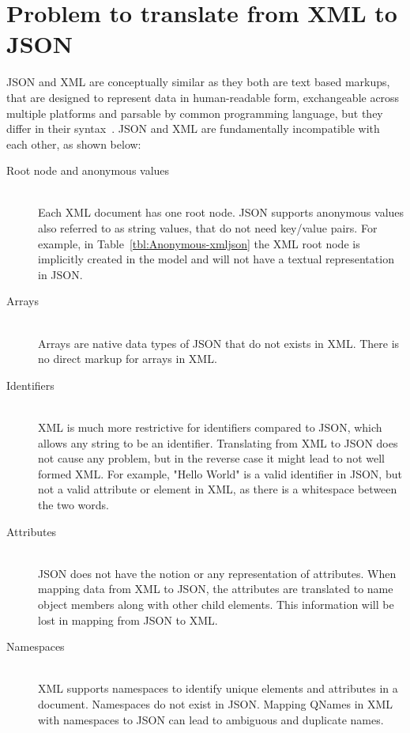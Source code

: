 \section{Problem to translate from XML to JSON}
JSON and XML are conceptually similar as they both are text based markups, that are designed to represent data in human-readable form, exchangeable across multiple platforms and parsable by common programming language, but they differ in their syntax~\citep{lee2011jxon}. JSON and XML are fundamentally incompatible with each other, as shown below:
\begin{description}
\item[Root node and anonymous values] \hfill \\
Each XML document has one root node. JSON supports anonymous values also referred to as string values, that do not need key/value pairs. For example, in Table~\ref{tbl:Anonymous-xmljson} the XML root node is implicitly created in the model and will not have a textual representation in JSON.

	\item[Arrays] \hfill \\
		Arrays are native data types of JSON that do not exists in XML. There is no direct markup for arrays in XML.
		\item[Identifiers] \hfill \\
		XML is much more restrictive for identifiers compared to JSON, which allows any string to be an identifier. Translating from XML to JSON does not cause any problem, but in the reverse case it might lead to not well formed XML. For example, "Hello World" is a valid identifier in JSON, but not a valid attribute or element in XML, as there is a whitespace between the two words.
		\item[Attributes] \hfill \\
		JSON does not have the notion or any representation of attributes. When mapping data from XML to JSON, the attributes are translated to name object members along with other child elements. This information will be lost in mapping from JSON to XML.
		\item[Namespaces] \hfill \\
		XML supports namespaces to identify  unique elements and attributes in a document. Namespaces do not exist in JSON. Mapping QNames in XML with namespaces to JSON can lead to ambiguous and duplicate names.
\end{description}

